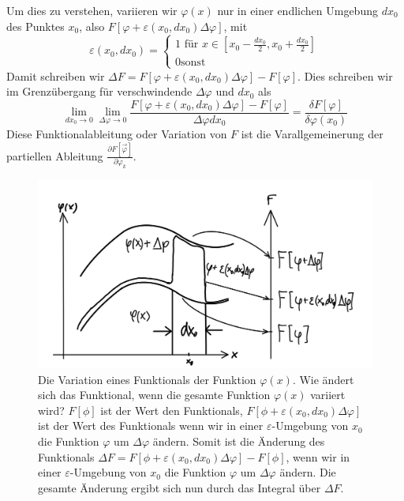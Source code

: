 Um dies zu verstehen, variieren wir $\varphi(x)$ nur in einer endlichen
Umgebung $dx_0$ des Punktes $x_0$, also
$F[\varphi+\varepsilon(x_0,dx_0)\Delta\varphi]$, mit 
  \begin{equation}\label{eq:umgebungeps}
    \varepsilon(x_0,dx_0)=\left\{\begin{matrix}1\text{ für
    }x\in[x_0-\frac{dx_0}{2},x_0+\frac{dx_0}{2}]\\ 0 \text{
    sonst}\end{matrix}\right.
  \end{equation}
Damit schreiben wir $\Delta F=F[\varphi +\varepsilon(x_0,dx_0) \Delta\varphi]
-F[\varphi]$. Dies schreiben wir im Grenzübergang für verschwindende
$\Delta\varphi$ und $dx_0$ als
\begin{equation}\label{eq:Variationsableitung}
  \lim_{dx_0\rightarrow 0}\lim_{\Delta\varphi\rightarrow 0}
      \frac{F[\varphi+\varepsilon(x_0,dx_0)\Delta\varphi]-F[\varphi]}{\Delta\varphi dx_0}
    =\frac{\delta F[\varphi]}{\delta\varphi(x_0)}
\end{equation} 
Diese Funktionalableitung oder Variation von $F$ ist die Varallgemeinerung der
partiellen Ableitung $\frac{\partial F[\vec{\varphi}]}{\partial\varphi_k}$.
%
\begin{figure}[!h] 
 \begin{center}
  \includegraphics[height=0.4\textwidth]{fig/Variation.jpeg}
  \caption{Die Variation eines Funktionals der Funktion $\varphi(x)$. Wie
    ändert sich das Funktional, wenn die gesamte Funktion $\varphi(x)$ variiert
    wird? $F[\phi]$ ist der Wert den Funktionals,
    $F[\phi+\varepsilon(x_0,dx_0)\Delta\varphi]$ ist der Wert des Funktionals
    wenn wir in einer $\varepsilon$-Umgebung von $x_0$ die Funktion $\varphi$
    um $\Delta\varphi$ ändern. Somit ist die Änderung des Funktionals $\Delta
    F=F[\phi+\varepsilon(x_0,dx_0)\Delta\varphi]-F[\phi]$, wenn wir in einer
    $\varepsilon$-Umgebung von $x_0$ die Funktion $\varphi$ um $\Delta\varphi$
    ändern. Die gesamte Änderung ergibt sich nun durch das Integral über $\Delta
    F$.\label{fig:variation}}
 \end{center}
\end{figure}
